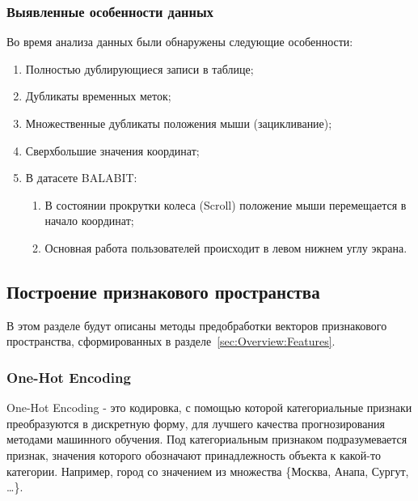 \documentclass[12pt]{article}
\begin{document}
    \subsubsection{Выявленные особенности данных}
    \label{sec:Research:Data:Features}

    \noindent Во время анализа данных были обнаружены следующие особенности:
    \begin{enumerate}
        \item Полностью дублирующиеся записи в таблице;
        \item Дубликаты временных меток;
        \item Множественные дубликаты положения мыши (зацикливание);
        \item Сверхбольшие значения координат;
        \item В датасете BALABIT:
        \begin{enumerate}
            \item В состоянии прокрутки колеса (Scroll) положение мыши перемещается в начало координат;
            \item Основная работа пользователей происходит в левом нижнем углу экрана.
        \end{enumerate}
    \end{enumerate}


    \subsection{Построение признакового пространства}
    \label{sec:Research:FeatureSpace}

    \par В этом разделе будут описаны методы предобработки векторов признакового пространства, сформированных в разделе~\ref{sec:Overview:Features}.

    \subsubsection{One-Hot Encoding}
    \label{sec:Research:FeatureSpace:OneHotEncoding}

    \par One-Hot Encoding - это кодировка, с помощью которой категориальные признаки преобразуются в дискретную форму, для лучшего качества прогнозирования методами машинного обучения. Под категориальным признаком подразумевается признак, значения которого обозначают принадлежность объекта к какой-то категории. Например, город со значением из множества \{Москва, Анапа, Сургут, \ldots\}. \\
\end{document}
